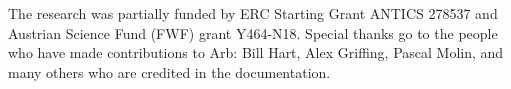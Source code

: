 \documentclass[10pt,journal,compsoc,cspaper]{IEEEtran}
\begin{document}
The research was partially funded by
ERC Starting Grant ANTICS 278537 and Austrian Science Fund (FWF) grant Y464-N18.
Special thanks go to the people who have made contributions to Arb:
Bill Hart, Alex Griffing, Pascal Molin, and
many others who are credited in the documentation.





%







%


% 

\end{document}
